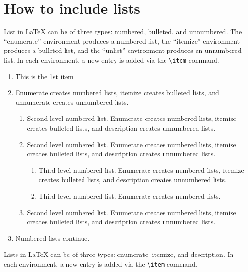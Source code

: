 \section{How to include lists}\label{sec7}

List in \LaTeX{} can be of three types: numbered, bulleted, and unnumbered. The ``enumerate'' environment produces a numbered list, the 
``itemize'' environment produces a bulleted list, and the ``unlist''
environment produces an unnumbered list.
In each environment, a new entry is added via the \verb+\item+ command.

\begin{enumerate}[label=\arabic*.]
\item This is the 1st item
\item Enumerate creates numbered lists, itemize creates bulleted lists, and unnumerate creates unnumbered lists.

\begin{enumerate}[label=\alph*.]
\item Second level numbered list. Enumerate creates numbered lists, itemize creates bulleted lists, and description creates unnumbered lists.
\item Second level numbered list. Enumerate creates numbered lists, itemize creates bulleted lists, and description creates unnumbered lists.

\begin{enumerate}[label=(\roman*)]
\item Third level numbered list. Enumerate creates numbered lists, itemize creates bulleted lists, and description creates unnumbered lists.
\item Third level numbered list. Enumerate creates numbered lists.
\end{enumerate}

\item Second level numbered list. Enumerate creates numbered lists, itemize creates bulleted lists, and description creates unnumbered lists.
\end{enumerate}

\item Numbered lists continue.
\end{enumerate}
Lists in \LaTeX{} can be of three types: enumerate, itemize, and description.
In each environment, a new entry is added via the \verb+\item+ command.

